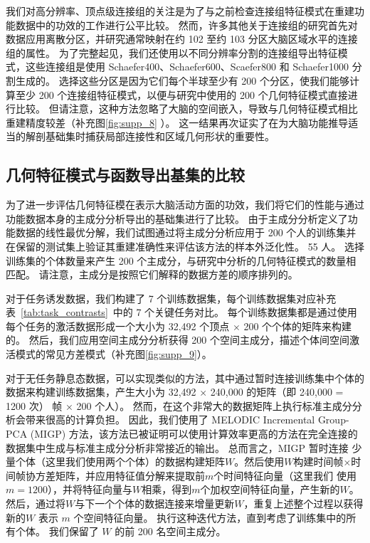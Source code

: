 \documentclass[lang=cn,a4paper,newtx,citestyle=gb7714-2015, bibstyle=gb7714-2015]{elegantpaper}
\begin{document}
我们对高分辨率、顶点级连接组的关注是为了与之前检查连接组特征模式在重建功能数据中的功效的工作进行公平比较\cite{mitra2015lag,felleman1991distributed}。
然而，许多其他关于连接组的研究首先对数据应用离散分区，并研究通常映射在约 102 至约 103 分区大脑区域水平的连接组的属性\cite{chaudhuri2015large,goodale1992separate}。
为了完整起见，我们还使用以不同分辨率分割的连接组导出特征模式，这些连接组是使用 Schaefer400、Schaefer600、Scaefer800 和 Schaefer1000 分割生成的。
选择这些分区是因为它们每个半球至少有 200 个分区，使我们能够计算至少 200 个连接组特征模式，以便与研究中使用的 200 个几何特征模式直接进行比较。
但请注意，这种方法忽略了大脑的空间嵌入，导致与几何特征模式相比重建精度较差（补充图\ref{fig:supp_8}
）。
这一结果再次证实了在为大脑功能推导适当的解剖基础集时捕获局部连接性和区域几何形状的重要性。




\subsection{几何特征模式与函数导出基集的比较} \label{sec:comparison_eigenmodes_derived}

为了进一步评估几何特征模在表示大脑活动方面的功效，我们将它们的性能与通过功能数据本身的主成分分析导出的基础集进行了比较。
由于主成分分析定义了功能数据的线性最优分解，我们试图通过将主成分分析应用于 200 个人的训练集并在保留的测试集上验证其重建准确性来评估该方法的样本外泛化性。 55 人。 
选择训练集的个体数量来产生 200 个主成分，与研究中分析的几何特征模式的数量相匹配。
请注意，主成分是按照它们解释的数据方差的顺序排列的。


对于任务诱发数据，我们构建了 7 个训练数据集，每个训练数据集对应补充表~\ref{tab:task_contrasts}~中的 7 个关键任务对比。
每个训练数据集都是通过使用每个任务的激活数据形成一个大小为 32,492 个顶点 $ \times $ 200 个个体的矩阵来构建的。
然后，我们应用空间主成分分析获得 200 个空间主成分，描述个体间空间激活模式的常见方差模式（补充图\ref{fig:supp_9}）。


对于无任务静息态数据，可以实现类似的方法，其中通过暂时连接训练集中个体的数据来构建训练数据集，产生大小为 32,492 $ \times $ 240,000 的矩阵（即 240,000 = 1200 次） 帧 × 200 个人）。
然而，在这个非常大的数据矩阵上执行标准主成分分析会带来很高的计算负担。
因此，我们使用了 MELODIC Incremental Group-PCA (MIGP) 方法，该方法已被证明可以使用计算效率更高的方法\cite{markov2014anatomy}在完全连接的数据集中生成与标准主成分分析非常接近的输出。
总而言之，MIGP 暂时连接 少量个体（这里我们使用两个个体）的数据构建矩阵$ W $。然后使用$ W $构建时间帧×时间帧协方差矩阵，并应用特征值分解来提取前$ m $个时间特征向量（这里我们 使用$ m = 1200 $），并将特征向量与$ W $相乘，得到$ m $个加权空间特征向量，产生新的$ W $。
然后，通过将$ W $与下一个个体的数据连接来增量更新$ W $，重复上述整个过程以获得新的$ W $ 表示 $ m $ 个空间特征向量。
执行这种迭代方法，直到考虑了训练集中的所有个体。
我们保留了 $ W $ 的前 200 名空间主成分。
\end{document}
